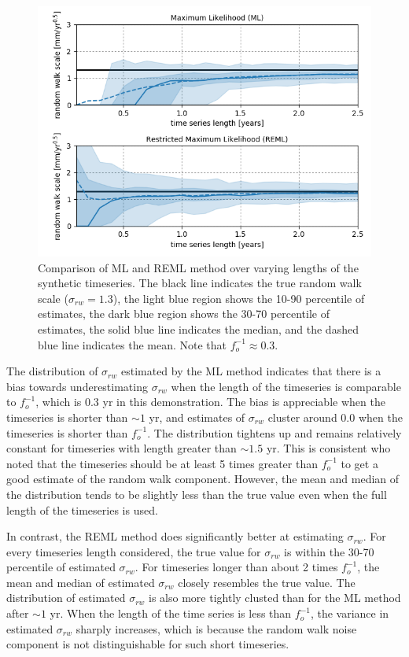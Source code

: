 \documentclass[10pt,a4paper]{article}
\begin{document}
\begin{figure}
\includegraphics[scale=1.0]{figure_1.png}
\caption{Comparison of ML and REML method over varying lengths of the synthetic timeseries. The black line indicates the true random walk scale ($\sigma_{rw}=1.3$), the light blue region shows the 10-90 percentile of estimates, the dark blue region shows the 30-70 percentile of estimates, the solid blue line indicates the median, and the dashed blue line indicates the mean. Note that $f_o^{-1} \approx 0.3$.}   
\label{fig:EstimateRW}
\end{figure}

The distribution of $\sigma_{rw}$ estimated by the ML method indicates that there is a bias towards underestimating $\sigma_{rw}$ when the length of the timeseries is comparable to $f_o^{-1}$, which is 0.3 yr in this demonstration. The bias is appreciable when the timeseries is shorter than ${\sim}1$ yr, and estimates of $\sigma_{rw}$ cluster around 0.0 when the timeseries is shorter than $f_o^{-1}$. The distribution tightens up and remains relatively constant for timeseries with length greater than ${\sim}1.5$ yr. This is consistent \citet{Langbein1997} who noted that the timeseries should be at least 5 times greater than $f_o^{-1}$ to get a good estimate of the random walk component. However, the mean and median of the distribution tends to be slightly less than the true value even when the full length of the timeseries is used.

In contrast, the REML method does significantly better at estimating $\sigma_{rw}$. For every timeseries length considered, the true value for $\sigma_{rw}$ is within the 30-70 percentile of estimated $\sigma_{rw}$. For timeseries longer than about 2 times $f_o^{-1}$, the mean and median of estimated $\sigma_{rw}$ closely resembles the true value. The distribution of estimated $\sigma_{rw}$ is also more tightly clusted than for the ML method after ${\sim}1$ yr.  When the length of the time series is less than $f_o^{-1}$, the variance in estimated $\sigma_{rw}$ sharply increases, which is because the random walk noise component is not distinguishable for such short timeseries.  
  
\end{document}
